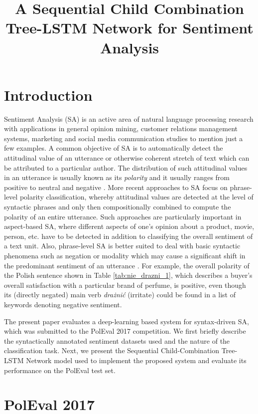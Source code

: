 \documentclass[10pt, a4paper]{article}
\title{A Sequential Child Combination Tree-LSTM Network for Sentiment Analysis}
\begin{document}
\maketitleabstract

\section{Introduction}   
Sentiment Analysis (SA) is an active area of natural language processing research with applications in general opinion mining, customer relations management systems, marketing and social media communication studies to mention just a few examples. A common objective of SA is to automatically detect the attitudinal value of an utterance or otherwise coherent stretch of text which can be attributed to a particular author. The distribution of  such attitudinal values in an utterance is usually known as its \textit{polarity} and it usually ranges from positive to neutral and negative \cite{cambria_schuller}. More recent approaches to SA focus on phrase-level polarity classification, whereby attitudinal values are detected at the level of syntactic phrases and only then compositionally combined to compute the polarity of an entire utterance. Such approaches are particularly important in aspect-based SA, where different aspects of one's opinion about a product, movie, person, etc. have to be detected in addition to  classifying the overall sentiment of a text unit. Also, phrase-level SA is better suited to deal with basic syntactic phenomena such as negation or modality which may cause a significant shift in the predominant sentiment of an utterance \cite{wilson_wiebe}. For example, the overall polarity of the Polish sentence shown in Table \ref{tab:nie_drazni_1}, which describes a buyer's overall satisfaction with a particular brand of perfume, is positive, even though its (directly negated) main verb \textit{drażnić} (irritate) could be found in a list of keywords denoting negative sentiment. 
\par The present paper evaluates a deep-learning based system for syntax-driven SA, which was submitted to the PolEval 2017 competition. We first briefly describe the syntactically annotated sentiment datasets used and the nature of the classification task. Next, we present the Sequential Child-Combination Tree-LSTM Network model used to implement the proposed system and evaluate its performance on the PolEval test set.


\section{PolEval 2017}
\end{document}
